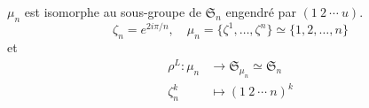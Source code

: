 \begin{example}
    \(\mu_n\) est isomorphe au sous-groupe de \({\mathfrak{S}}_n\) engendré par \((1~2~\cdots~u)\).
    \begin{equation*}
        \zeta_n = e^{2i\pi/n}, \quad \mu_n = \{\zeta^1,\ldots,\zeta^{n}\} \simeq \{1,2,\ldots,n\}
    \end{equation*}
    et
    \begin{equation*}
        \begin{aligned}
            \rho^L : \mu_n &\to {\mathfrak{S}}_{\mu_n} \simeq {\mathfrak{S}}_{n}\\
            \zeta_n^k &\mapsto (1~2~\cdots~n)^k
        \end{aligned}
    \end{equation*}
\end{example}


